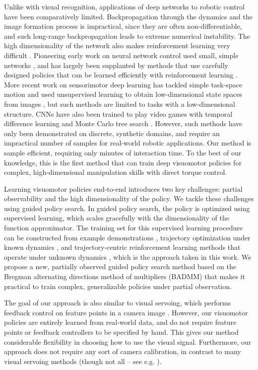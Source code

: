 \documentclass[conference]{IEEEtran}
\begin{document}
Unlike with visual recognition, applications of deep networks to robotic control have been comparatively limited. Backpropagation through the dynamics and the image formation process is impractical, since they are often non-differentiable, and such long-range backpropagation leads to extreme numerical instability. The high dimensionality of the network also makes reinforcement learning very difficult \cite{dnp-spsr-13}. Pioneering early work on neural network control used small, simple networks \cite{hszg-nncss-92,p-alvin-89}, and has largely been supplanted by methods that use carefully designed policies that can be learned efficiently with reinforcement learning \cite{kbp-rlrs-13}. More recent work on sensorimotor deep learning has tackled simple task-space motion \cite{lr-avsrg-13} and used unsupervised learning to obtain low-dimensional state spaces from images \cite{rlv-arlrv-12}, but such methods are limited to tasks with a low-dimensional structure. CNNs have also been trained to play video games with temporal difference learning and Monte Carlo tree search \cite{gsllw-amcts-14,mksga-padrl-13}. However, such methods have only been demonstrated on discrete, synthetic domains, and require an impractical number of samples for real-world robotic applications. Our method is sample efficient, requiring only minutes of interaction time. To the best of our knowledge, this is the first method that can train deep visuomotor policies for complex, high-dimensional manipulation skills with direct torque control.

Learning visuomotor policies end-to-end introduces two key challenges: partial observability and the high dimensionality of the policy. We tackle these challenges using guided policy search. In guided policy search, the policy is optimized using supervised learning, which scales gracefully with the dimensionality of the function approximator. The training set for this supervised learning procedure can be constructed from example demonstrations \cite{lk-gps-13}, trajectory optimization under known dynamics \cite{lk-vpsto-13,lk-lcnnp-14,mt-cbfat-14}, and trajectory-centric reinforcement learning methods that operate under unknown dynamics \cite{la-lnnpg-14,lwa-lnnpg-15}, which is the approach taken in this work. We propose a new, partially observed guided policy search method based on the Bregman alternating directions method of multipliers (BADMM) that makes it practical to train complex, generalizable policies under partial observation.

The goal of our approach is also similar to visual servoing, which performs feedback control on feature points in a camera image \cite{ecr-navsr-92,mkd-vbcqp-14,whb-reecu-96}. However, our visuomotor policies are entirely learned from real-world data, and do not require feature points or feedback controllers to be specified by hand. This gives our method considerable flexibility in choosing how to use the visual signal. Furthermore, our approach does not require any sort of camera calibration, in contrast to many visual servoing methods (though not all -- see e.g. \cite{jfn-eeuvs-97,ya-auvs-94}).
\end{document}
